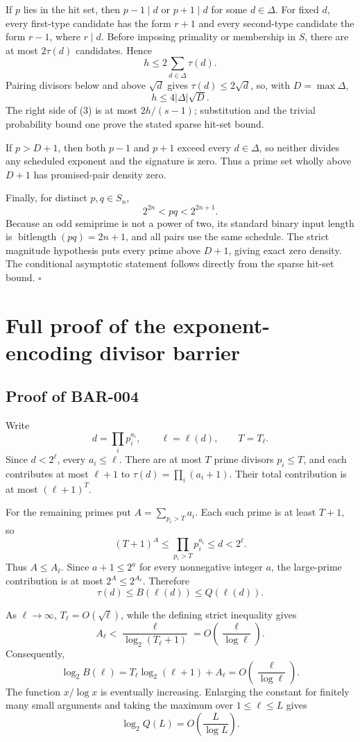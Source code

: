 \documentclass[11pt]{article}
\begin{document}
If \(p\) lies in the hit set, then \(p-1\mid d\) or \(p+1\mid d\) for some
\(d\in\Delta\). For fixed \(d\), every first-type candidate has the form
\(r+1\) and every second-type candidate the form \(r-1\), where \(r\mid d\).
Before imposing primality or membership in \(S\), there are at most
\(2\tau(d)\) candidates. Hence
\[
h\le2\sum_{d\in\Delta}\tau(d).
\]
Pairing divisors below and above \(\sqrt d\) gives
\(\tau(d)\le2\sqrt d\), so, with \(D=\max\Delta\),
\[
h\le4|\Delta|\sqrt D.
\]
The right side of (3) is at most \(2h/(s-1)\); substitution and the trivial
probability bound one prove the stated sparse hit-set bound.

If \(p>D+1\), then both \(p-1\) and \(p+1\) exceed every
\(d\in\Delta\), so neither divides any scheduled exponent and the signature
is zero. Thus a prime set wholly above \(D+1\) has promised-pair density zero.

Finally, for distinct \(p,q\in S_n\),
\[
2^{2n}<pq<2^{2n+1}.
\]
Because an odd semiprime is not a power of two, its standard binary input
length is \(\operatorname{bitlength}(pq)=2n+1\), and all pairs use the same
schedule.
The strict magnitude hypothesis puts every prime above \(D+1\), giving exact
zero density. The conditional asymptotic statement follows directly from the
sparse hit-set bound. \(\square\)

\section{Full proof of the exponent-encoding divisor barrier}

\subsection{Proof of BAR-004}\label{proof:BAR-004}

Write
\[
d=\prod_i p_i^{a_i},\qquad
\ell=\ell(d),\qquad
T=T_\ell.
\]
Since \(d<2^\ell\), every \(a_i\le\ell\). There are at most \(T\) prime
divisors \(p_i\le T\), and each contributes at most \(\ell+1\) to
\(\tau(d)=\prod_i(a_i+1)\). Their total contribution is at most
\((\ell+1)^T\).

For the remaining primes put \(A=\sum_{p_i>T}a_i\). Each such prime is at
least \(T+1\), so
\[
(T+1)^A
\le\prod_{p_i>T}p_i^{a_i}
\le d<2^\ell.
\]
Thus \(A\le A_\ell\). Since \(a+1\le2^a\) for every nonnegative integer
\(a\), the large-prime contribution is at most
\(2^A\le2^{A_\ell}\). Therefore
\[
\tau(d)\le B(\ell(d))\le Q(\ell(d)).
\]

As \(\ell\to\infty\), \(T_\ell=O(\sqrt\ell)\), while the defining strict
inequality gives
\[
A_\ell<
\frac{\ell}{\log_2(T_\ell+1)}
=O\!\left(\frac{\ell}{\log\ell}\right).
\]
Consequently,
\[
\log_2B(\ell)
=T_\ell\log_2(\ell+1)+A_\ell
=O\!\left(\frac{\ell}{\log\ell}\right).
\]
The function \(x/\log x\) is eventually increasing. Enlarging the constant
for finitely many small arguments and taking the maximum over
\(1\le\ell\le L\) gives
\[
\log_2Q(L)=O\!\left(\frac{L}{\log L}\right).
\]
\end{document}
